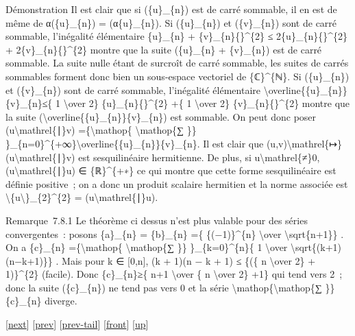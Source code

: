 \documentclass[]{article}
\begin{document}
Démonstration Il est clair que si (\{u\}\_\{n\}) est de carré sommable,
il en est de même de α(\{u\}\_\{n\}) = (α\{u\}\_\{n\}). Si
(\{u\}\_\{n\}) et (\{v\}\_\{n\}) sont de carré sommable, l'inégalité
élémentaire \textbar{}\{u\}\_\{n\} + \{v\}\_\{n\}\{\textbar{}\}\^{}\{2\}
≤ 2\textbar{}\{u\}\_\{n\}\{\textbar{}\}\^{}\{2\} +
2\textbar{}\{v\}\_\{n\}\{\textbar{}\}\^{}\{2\} montre que la suite
(\{u\}\_\{n\} + \{v\}\_\{n\}) est de carré sommable. La suite nulle
étant de surcroît de carré sommable, les suites de carrés sommables
forment donc bien un sous-espace vectoriel de \{ℂ\}\^{}\{ℕ\}. Si
(\{u\}\_\{n\}) et (\{v\}\_\{n\}) sont de carré sommable, l'inégalité
élémentaire
\textbar{}\textbackslash{}overline\{\{u\}\_\{n\}\}\{v\}\_\{n\}\textbar{}≤\{
1 \textbackslash{}over 2\} \textbar{}\{u\}\_\{n\}\{\textbar{}\}\^{}\{2\}
+\{ 1 \textbackslash{}over 2\}
\textbar{}\{v\}\_\{n\}\{\textbar{}\}\^{}\{2\} montre que la suite
(\textbackslash{}overline\{\{u\}\_\{n\}\}\{v\}\_\{n\}) est sommable. On
peut donc poser (u\textbackslash{}mathrel\{∣\}v)
=\{\textbackslash{}mathop\{ \textbackslash{}mathop\{∑ \}\}
\}\_\{n=0\}\^{}\{+∞\}\textbackslash{}overline\{\{u\}\_\{n\}\}\{v\}\_\{n\}.
Il est clair que
(u,v)\textbackslash{}mathrel\{↦\}(u\textbackslash{}mathrel\{∣\}v) est
sesquilinéaire hermitienne. De plus, si u\textbackslash{}mathrel\{≠\}0,
(u\textbackslash{}mathrel\{∣\}u) ∈ \{ℝ\}\^{}\{+∗\} ce qui montre que
cette forme sesquilinéaire est définie positive~; on a donc un produit
scalaire hermitien et la norme associée est
\textbackslash{}\textbar{}\{u\textbackslash{}\textbar{}\}\_\{2\}\^{}\{2\}
= (u\textbackslash{}mathrel\{∣\}u).

Remarque~7.8.1 Le théorème ci dessus n'est plus valable pour des séries
convergentes~: posons \{a\}\_\{n\} = \{b\}\_\{n\} =\{ \{(−1)\}\^{}\{n\}
\textbackslash{}over \textbackslash{}sqrt\{n+1\}\} . On a
\textbar{}\{c\}\_\{n\}\textbar{} =\{\textbackslash{}mathop\{
\textbackslash{}mathop\{∑ \}\} \}\_\{k=0\}\^{}\{n\}\{ 1
\textbackslash{}over \textbackslash{}sqrt\{(k+1)(n−k+1)\}\} . Mais pour
k ∈ {[}0,n{]}, (k + 1)(n − k + 1) ≤ \{(\{ n \textbackslash{}over 2\} +
1)\}\^{}\{2\} (facile). Donc \textbar{}\{c\}\_\{n\}\textbar{}≥\{ n+1
\textbackslash{}over \{ n \textbackslash{}over 2\} +1\} qui tend vers
2~; donc la suite (\{c\}\_\{n\}) ne tend pas vers 0 et la série
\textbackslash{}mathop\{\textbackslash{}mathop\{∑ \}\} \{c\}\_\{n\}
diverge.

{[}\href{coursse43.html}{next}{]} {[}\href{coursse41.html}{prev}{]}
{[}\href{coursse41.html\#tailcoursse41.html}{prev-tail}{]}
{[}\href{coursse42.html}{front}{]}
{[}\href{coursch8.html\#coursse42.html}{up}{]}
\end{document}
